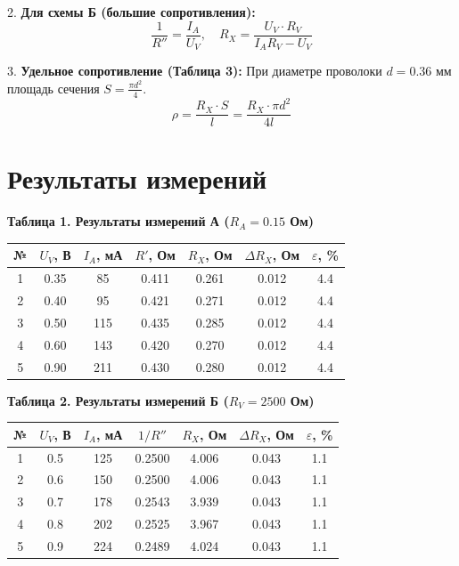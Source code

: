 \documentclass[a4paper,14pt]{extarticle}
\begin{document}
2. \textbf{Для схемы Б (большие сопротивления):}
$$\frac{1}{R''} = \frac{I_A}{U_V}, \quad R_X = \frac{U_V \cdot R_V}{I_A R_V - U_V}$$

3. \textbf{Удельное сопротивление (Таблица 3):}
При диаметре проволоки $d = 0.36$ мм площадь сечения $S = \frac{\pi d^2}{4}$. 
$$\rho = \frac{R_X \cdot S}{l} = \frac{R_X \cdot \pi d^2}{4l}$$

\section*{Результаты измерений}

\begin{center}
\small
\textbf{Таблица 1. Результаты измерений А ($R_A = 0.15$ Ом)}
\begin{tabular}{|c|c|c|c|c|c|c|}
\hline
№ & $U_V$, В & $I_A$, мА & $R'$, Ом & $R_X$, Ом & $\Delta R_X$, Ом & $\varepsilon$, \% \\ \hline
1 & 0.35 & 85  & 0.411 & 0.261 & 0.012 & 4.4 \\ \hline
2 & 0.40 & 95  & 0.421 & 0.271 & 0.012 & 4.4 \\ \hline
3 & 0.50 & 115 & 0.435 & 0.285 & 0.012 & 4.4 \\ \hline
4 & 0.60 & 143 & 0.420 & 0.270 & 0.012 & 4.4 \\ \hline
5 & 0.90 & 211 & 0.430 & 0.280 & 0.012 & 4.4 \\ \hline
\end{tabular}
\end{center}

\begin{center}
\small
\textbf{Таблица 2. Результаты измерений Б ($R_V = 2500$ Ом)}
\begin{tabular}{|c|c|c|c|c|c|c|}
\hline
№ & $U_V$, В & $I_A$, мА & $1/R''$ & $R_X$, Ом & $\Delta R_X$, Ом & $\varepsilon$, \% \\ \hline
1 & 0.5 & 125 & 0.2500 & 4.006 & 0.043 & 1.1 \\ \hline
2 & 0.6 & 150 & 0.2500 & 4.006 & 0.043 & 1.1 \\ \hline
3 & 0.7 & 178 & 0.2543 & 3.939 & 0.043 & 1.1 \\ \hline
4 & 0.8 & 202 & 0.2525 & 3.967 & 0.043 & 1.1 \\ \hline
5 & 0.9 & 224 & 0.2489 & 4.024 & 0.043 & 1.1 \\ \hline
\end{tabular}
\end{center}
\end{document}
